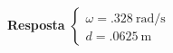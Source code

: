 \textbf{Resposta}
$
\begin{cases}
	\omega=\SI{.328}{\radian/\second}\\
	d=\SI{.0625}{\meter}
\end{cases}
$